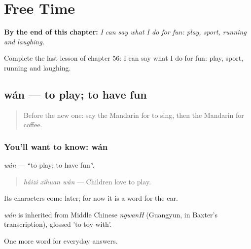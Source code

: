 
\chapter{Free Time}
\label{ch:zh-free-time}

\begin{chapteropening}
\textbf{By the end of this chapter:} \emph{I can say what I do for fun: play, sport, running and laughing.}

Complete the last lesson of chapter 56: I can say what I do for fun: play, sport, running and laughing.
\end{chapteropening}

\section[wán]{wán — to play; to have fun}

\label{lesson:ZH-C56-wan}



\begin{quote}
Before the new one: say the Mandarin for to sing, then the Mandarin for coffee.
\end{quote}

\subsection*{You'll want to know: wán}
\emph{wán} — \textquotedblleft{}to play; to have fun\textquotedblright{}.

\begin{quote}
\emph{háizi xǐhuan wán} — Children love to play.
\end{quote}

Its characters come later; for now it is a word for the ear.

\begin{cousinweb}
\emph{wán} is inherited from Middle Chinese \emph{ngwanH} (Guangyun, in Baxter's transcription), glossed 'to toy with'.
\end{cousinweb}

\begin{grammarlens}[title={What you've built}]
One more word for everyday answers.
\end{grammarlens}

